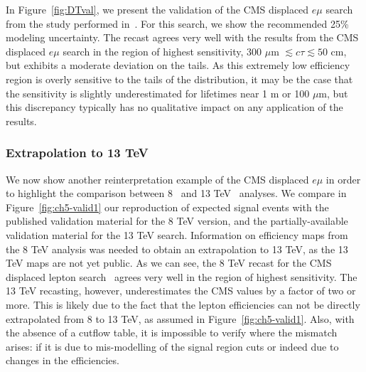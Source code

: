 In Figure~\ref{fig:DTval}, we present the validation of the CMS displaced $e\mu$
search~\cite{Khachatryan:2014mea} from the study performed
in~\cite{Evans:2016zau}.  For this search, we show the recommended 25\% modeling
uncertainty. The recast agrees very well with the results from the CMS displaced
$e\mu$ search  in the region of highest sensitivity, 300 $\mu$m $\lesssim c\tau
\lesssim 50$ cm, but exhibits a moderate deviation on the tails.   As this
extremely low efficiency region is overly sensitive to the tails of the
distribution, it may be the case that the sensitivity is slightly underestimated
for lifetimes near 1 m or 100 $\mu$m, but this discrepancy typically has no
qualitative impact on any application of the results.

\subsubsection{Extrapolation to 13 TeV}

We now show another reinterpretation example of the CMS displaced $e\mu$ in
order to highlight the comparison between 8~\cite{Khachatryan:2014mea} and 13
TeV~\cite{CMS-PAS-EXO-16-022} analyses. We compare in
Figure~\ref{fig:ch5-valid1} our reproduction of expected signal events with the
published validation material for the 8 TeV version, and the partially-available
validation material for the 13 TeV search.
Information on efficiency maps from the 8 TeV analysis was needed
to obtain an extrapolation to 13 TeV, as the 13 TeV maps are not yet public.
As we can see, the 8 TeV recast for the CMS displaced lepton
search~\cite{Khachatryan:2014mea} agrees very well in the region of highest
sensitivity. The 13 TeV recasting, however, underestimates the CMS values
by a factor of two or more. This is likely due to the fact that the
lepton efficiencies can not be directly extrapolated from 8 to 13 TeV,
as assumed in Figure~\ref{fig:ch5-valid1}. 
Also, with the absence of a cutflow table, it is impossible to verify where the
mismatch arises: if it is due to mis-modelling of the signal region
cuts or indeed due to changes in the efficiencies.



